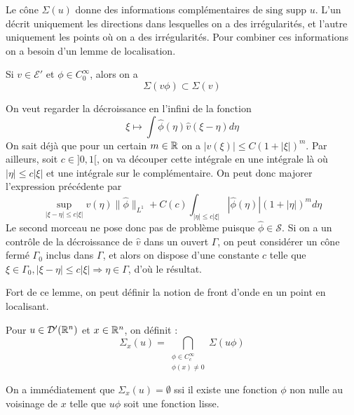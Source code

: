 Le cône $\Sigma(u)$ donne des informations complémentaires de $\text{sing supp }u$. L'un décrit uniquement les directions dans lesquelles on a des irrégularités, et l'autre uniquement les points où on a des irrégularités. Pour combiner ces informations on a besoin d'un lemme de localisation.

\begin{lem}
	Si $v \in \mathcal{E}'$ et $\phi \in C^{\infty}_0$, alors on a 
	\begin{equation*}
		\Sigma(v\phi) \subset \Sigma(v)
	\end{equation*}
\end{lem}
\begin{preuve}
	On veut regarder la décroissance en l'infini de la fonction
	\begin{equation*}
		\xi \mapsto \int \hat{\phi}(\eta)\hat{v}(\xi-\eta)d\eta
	\end{equation*}
	On sait déjà que pour un certain $m\in \mathbb{R}$ on a $|v(\xi)|\leq C(1+|\xi|)^m$. Par ailleurs, soit $c\in ]0,1[$, on va découper cette intégrale en une intégrale là où $|\eta| \leq c|\xi|$ et une intégrale sur le complémentaire. On peut donc majorer l'expression précédente par
	\begin{equation*}
		\underset{|\xi-\eta| \leq c|\xi|}{\sup}v(\eta) \|\hat{\phi}\|_{L^1} + C(c)\int_{|\eta|\leq c|\xi|}|\hat{\phi}(\eta)|(1+|\eta|)^md\eta
	\end{equation*}
	Le second morceau ne pose donc pas de problème puisque $\hat{\phi}\in \mathcal{S}$. Si on a un contrôle de la décroissance de $\hat{v}$ dans un ouvert $\Gamma$, on peut considérer un cône fermé $\Gamma_0$ inclus dans $\Gamma$, et alors on dispose d'une constante $c$ telle que $\xi \in \Gamma_0,|\xi-\eta|\leq c |\xi| \Rightarrow \eta \in \Gamma$, d'où le résultat.
\end{preuve}

Fort de ce lemme, on peut définir la notion de front d'onde en un point en localisant.
\begin{defn}
	Pour $u \in \mathcal{D'}(\mathbb{R}^n)$ et $x\in \mathbb{R}^n$, on définit :
	\begin{equation*}
		\Sigma_x(u)=\bigcap_{\substack{\phi \in C^{\infty}_c\\\phi(x)\neq 0}}\Sigma(u\phi)
	\end{equation*}
\end{defn}
On a immédiatement que $\Sigma_x(u)=\emptyset$ ssi il existe une fonction $\phi$ non nulle au voisinage de $x$ telle que $u\phi$ soit une fonction lisse.

